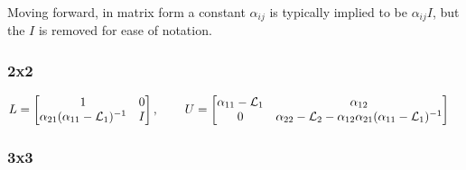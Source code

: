 \documentclass[a4paper,10pt]{article}
\begin{document}
Moving forward, in matrix form a constant $\alpha_{ij}$ is typically implied to be
$\alpha_{ij}I$, but the $I$ is removed for ease of notation.


\subsubsection{2x2}

\begin{align*}
L & = \begin{bmatrix}
	1 & 0 \\
	\alpha_{21} (\alpha_{11} - \mathcal{L}_1)^{-1} & I
\end{bmatrix}
,\hspace{5ex}
U = \begin{bmatrix}
	\alpha_{11} - \mathcal{L}_1 & \alpha_{12} \\
	0 & \alpha_{22} - \mathcal{L}_2 - \alpha_{12} \alpha_{21} (\alpha_{11} - \mathcal{L}_1)^{-1}
\end{bmatrix}
\end{align*}



\subsubsection{3x3}
\end{document}
